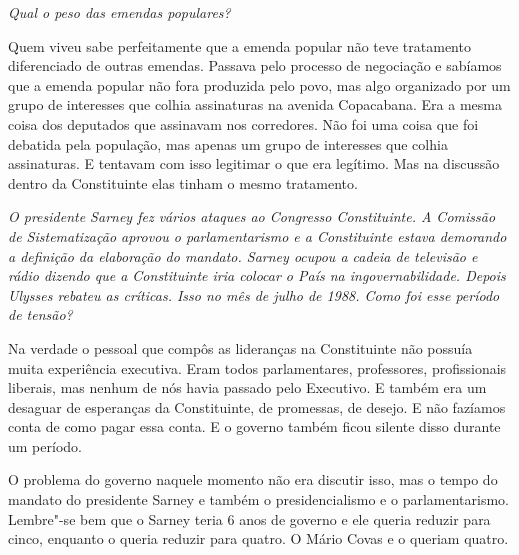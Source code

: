 \medskip

\noindent\emph{Qual o peso das emendas populares?}

Quem viveu sabe perfeitamente que a emenda popular não
teve tratamento diferenciado de outras emendas. Passava pelo processo de
negociação e sabíamos que a emenda popular não fora produzida pelo povo,
mas algo organizado por um grupo de interesses que colhia assinaturas na
avenida Copacabana. Era a mesma coisa dos deputados que assinavam nos
corredores. Não foi uma coisa que foi debatida pela população, mas
apenas um grupo de interesses que colhia assinaturas. E tentavam com
isso legitimar o que era legítimo. Mas na discussão dentro da
Constituinte elas tinham o mesmo tratamento.

\medskip

\noindent\emph{O presidente Sarney fez vários ataques ao Congresso
Constituinte. A Comissão de Sistematização aprovou o parlamentarismo e a
Constituinte estava demorando a definição da elaboração do mandato.
Sarney ocupou a cadeia de televisão e rádio dizendo que a Constituinte
iria colocar o País na ingovernabilidade. Depois Ulysses rebateu as
críticas. Isso no mês de julho de 1988. Como foi esse período de
tensão?}

Na verdade o pessoal que compôs as lideranças na
Constituinte não possuía muita experiência executiva. Eram todos
parlamentares, professores, profissionais liberais, mas nenhum de nós
havia passado pelo Executivo. E também era um desaguar de esperanças da
Constituinte, de promessas, de desejo. E não fazíamos conta de como
pagar essa conta. E o governo também ficou silente disso durante um
período.

O problema do governo naquele momento não era discutir isso, mas o tempo
do mandato do presidente Sarney e também o presidencialismo e o
parlamentarismo. Lembre"-se bem que o Sarney teria 6 anos de governo e
ele queria reduzir para cinco, enquanto o  queria reduzir para
quatro. O Mário Covas e o  queriam quatro.

